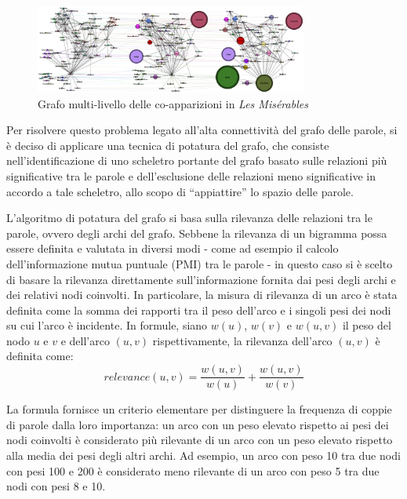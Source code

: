 \begin{figure}[h]
    \centering
    \includegraphics[width=0.8\textwidth]{Immagini/les_miserables_example.png}
    \caption{Grafo multi-livello delle co-apparizioni in \textit{Les Misérables}}
    \label{fig:les-miserables-graph}
\end{figure}

Per risolvere questo problema legato all'alta connettività del grafo delle parole, si è deciso di applicare
una tecnica di potatura del grafo, che consiste nell'identificazione di uno scheletro portante del grafo
basato sulle relazioni più significative tra le parole e dell'esclusione delle relazioni meno significative in
accordo a tale scheletro, allo scopo di ``appiattire'' lo spazio delle parole.


L'algoritmo di potatura del grafo si basa sulla rilevanza delle relazioni tra le parole, ovvero degli archi del grafo.
Sebbene la rilevanza di un bigramma possa essere definita e valutata in diversi modi - come ad esempio il calcolo
dell'informazione mutua puntuale (PMI) tra le parole - in questo caso si è scelto di basare la rilevanza
direttamente sull'informazione fornita dai pesi degli archi e dei relativi nodi coinvolti.
In particolare, la misura di rilevanza di un arco è stata definita come la somma dei rapporti tra il peso dell'arco
e i singoli pesi dei nodi su cui l'arco è incidente.
In formule, siano $w(u)$, $w(v)$ e $w(u, v)$ il peso del nodo $u$ e $v$ e dell'arco $(u, v)$ rispettivamente,
la rilevanza dell'arco $(u, v)$ è definita come:
\begin{equation*}
    relevance(u, v) = \frac{w(u, v)}{w(u)} + \frac{w(u, v)}{w(v)}
\end{equation*}

La formula fornisce un criterio elementare per distinguere la frequenza di coppie di parole dalla loro importanza:
un arco con un peso elevato rispetto ai pesi dei nodi coinvolti è considerato più rilevante di un arco con un peso
elevato rispetto alla media dei pesi degli altri archi.
Ad esempio, un arco con peso 10 tra due nodi con pesi 100 e 200 è considerato meno rilevante di un arco con peso 5
tra due nodi con pesi 8 e 10. \newline

